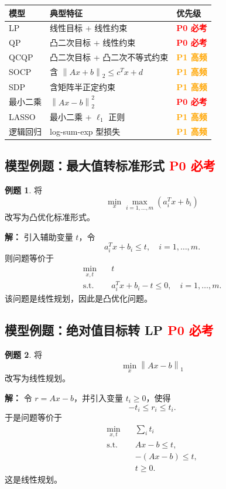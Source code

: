 \documentclass[11pt,a4paper]{ctexart}
\newcommand{\st}{\text{s.t.}}
\newcommand{\norm}[1]{\left\lVert #1 \right\rVert}
\newcommand{\Pzero}{\textcolor{red}{\textbf{P0 必考}}}
\newcommand{\Pone}{\textcolor{orange}{\textbf{P1 高频}}}
\theoremstyle{definition}
\newtheorem{example}{例题}[section]
\theoremstyle{plain}
\theoremstyle{remark}
\begin{document}
\begin{center}
\begin{tabular}{lll}
\toprule
模型 & 典型特征 & 优先级 \\
\midrule
LP & 线性目标 + 线性约束 & \Pzero \\
QP & 凸二次目标 + 线性约束 & \Pzero \\
QCQP & 凸二次目标 + 凸二次不等式约束 & \Pone \\
SOCP & 含 $\norm{Ax+b}_2\le c^Tx+d$ & \Pone \\
SDP & 含矩阵半正定约束 & \Pone \\
最小二乘 & $\norm{Ax-b}_2^2$ & \Pzero \\
LASSO & 最小二乘 + $\ell_1$ 正则 & \Pone \\
逻辑回归 & log-sum-exp 型损失 & \Pone \\
\bottomrule
\end{tabular}
\end{center}

\subsection{模型例题：最大值转标准形式 \Pzero}

\begin{example}
将
\[
    \min_x \max_{i=1,\dots,m}(a_i^Tx+b_i)
\]
改写为凸优化标准形式。

\textbf{解：}
引入辅助变量 $t$，令
\[
    a_i^Tx+b_i\le t,\quad i=1,\dots,m.
\]
则问题等价于
\[
\begin{aligned}
    \min_{x,t}\quad & t\\
    \st\quad &
    a_i^Tx+b_i-t\le0,\quad i=1,\dots,m.
\end{aligned}
\]
该问题是线性规划，因此是凸优化问题。
\end{example}

\subsection{模型例题：绝对值目标转 LP \Pzero}

\begin{example}
将
\[
    \min_x \norm{Ax-b}_1
\]
改写为线性规划。

\textbf{解：}
令 $r=Ax-b$，并引入变量 $t_i\ge0$，使得
\[
    -t_i\le r_i\le t_i.
\]
于是问题等价于
\[
\begin{aligned}
    \min_{x,t}\quad & \sum_i t_i\\
    \st\quad &
    Ax-b\le t,\\
    & -(Ax-b)\le t,\\
    & t\ge0.
\end{aligned}
\]
这是线性规划。
\end{example}
\end{document}
